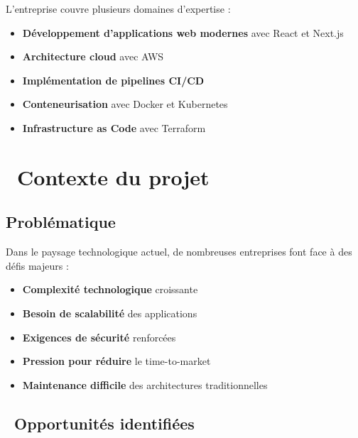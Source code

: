 L'entreprise couvre plusieurs domaines d'expertise :
\begin{itemize}
    \item \textcolor{primaryblue}{\textbf{Développement d'applications web modernes}} avec React et Next.js
    \item \textcolor{primaryblue}{\textbf{Architecture cloud}} avec AWS
    \item \textcolor{primaryblue}{\textbf{Implémentation de pipelines CI/CD}}
    \item \textcolor{primaryblue}{\textbf{Conteneurisation}} avec Docker et Kubernetes
    \item \textcolor{primaryblue}{\textbf{Infrastructure as Code}} avec Terraform
\end{itemize}

\section{\faExclamationTriangle\ Contexte du projet}

\subsection{Problématique}

Dans le paysage technologique actuel, de nombreuses entreprises font face à des défis majeurs :

\begin{warningbox}
\begin{itemize}
    \item \textcolor{accentorange}{\textbf{Complexité technologique}} croissante
    \item \textcolor{accentorange}{\textbf{Besoin de scalabilité}} des applications
    \item \textcolor{accentorange}{\textbf{Exigences de sécurité}} renforcées
    \item \textcolor{accentorange}{\textbf{Pression pour réduire}} le time-to-market
    \item \textcolor{accentorange}{\textbf{Maintenance difficile}} des architectures traditionnelles
\end{itemize}
\end{warningbox}

\subsection{\faLightbulb\ Opportunités identifiées}

